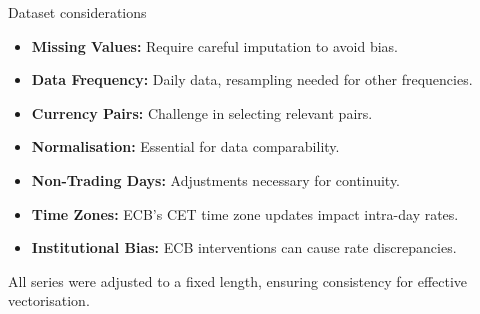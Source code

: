 \documentclass[aspectratio=169, 12pt]{beamer}
\begin{document}
\begin{frame}{Dataset considerations}
    \begin{itemize}
        \item \textbf{Missing Values:} Require careful imputation to avoid bias.
        
        \item \textbf{Data Frequency:} Daily data, resampling needed for other frequencies.
        
        \item \textbf{Currency Pairs:} Challenge in selecting relevant pairs.
        
        \item \textbf{Normalisation:} Essential for data comparability.
        
        \item \textbf{Non-Trading Days:} Adjustments necessary for continuity.
        
        \item \textbf{Time Zones:} ECB's CET time zone updates impact intra-day rates.
        
        \item \textbf{Institutional Bias:} ECB interventions can cause rate discrepancies.
    \end{itemize}

All series were adjusted to a fixed length, ensuring consistency for effective vectorisation.
\end{frame}
\end{document}
